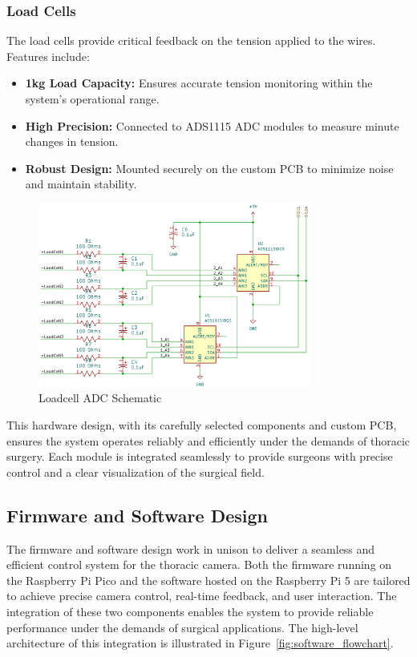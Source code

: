 \subsubsection{Load Cells}
The load cells provide critical feedback on the tension applied to the wires. Features include:
\begin{itemize}
    \item \textbf{1kg Load Capacity:} Ensures accurate tension monitoring within the system's operational range.
    \item \textbf{High Precision:} Connected to ADS1115 ADC modules to measure minute changes in tension.
    \item \textbf{Robust Design:} Mounted securely on the custom PCB to minimize noise and maintain stability.
\end{itemize}

\begin{figure}[H]
    \centering
    \includegraphics[width=0.8\textwidth]{images/ADC.png}
    \caption{Loadcell ADC Schematic}
    \label{fig:ADC}
\end{figure}


This hardware design, with its carefully selected components and custom PCB, ensures the system operates reliably and efficiently under the demands of thoracic surgery. Each module is integrated seamlessly to provide surgeons with precise control and a clear visualization of the surgical field.

\subsection{Firmware and Software Design}

The firmware and software design work in unison to deliver a seamless and efficient control system for the thoracic camera. Both the firmware running on the Raspberry Pi Pico and the software hosted on the Raspberry Pi 5 are tailored to achieve precise camera control, real-time feedback, and user interaction. The integration of these two components enables the system to provide reliable performance under the demands of surgical applications. The high-level architecture of this integration is illustrated in Figure~\ref{fig:software_flowchart}.

